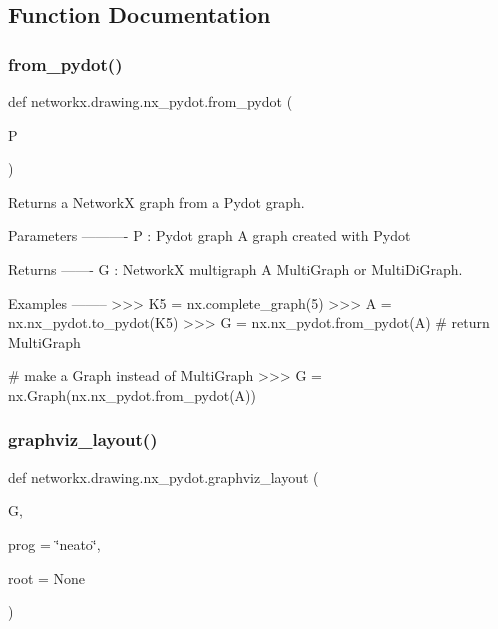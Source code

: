 \subsection{Function Documentation}
\mbox{\label{namespacenetworkx_1_1drawing_1_1nx__pydot_a3384bfb7e6bb5ebb35a2dae9ecf97994}} 
\subsubsection{\texorpdfstring{from\+\_\+pydot()}{from\_pydot()}}
{\footnotesize\ttfamily def networkx.\+drawing.\+nx\+\_\+pydot.\+from\+\_\+pydot (\begin{DoxyParamCaption}\item[{}]{P }\end{DoxyParamCaption})}

\begin{DoxyVerb}Returns a NetworkX graph from a Pydot graph.

Parameters
----------
P : Pydot graph
  A graph created with Pydot

Returns
-------
G : NetworkX multigraph
    A MultiGraph or MultiDiGraph.

Examples
--------
>>> K5 = nx.complete_graph(5)
>>> A = nx.nx_pydot.to_pydot(K5)
>>> G = nx.nx_pydot.from_pydot(A)  # return MultiGraph

# make a Graph instead of MultiGraph
>>> G = nx.Graph(nx.nx_pydot.from_pydot(A))\end{DoxyVerb}
 \mbox{\label{namespacenetworkx_1_1drawing_1_1nx__pydot_ad4e6130de869e7cfbccbc1bbe9bc72e1}} 
\subsubsection{\texorpdfstring{graphviz\+\_\+layout()}{graphviz\_layout()}}
{\footnotesize\ttfamily def networkx.\+drawing.\+nx\+\_\+pydot.\+graphviz\+\_\+layout (\begin{DoxyParamCaption}\item[{}]{G,  }\item[{}]{prog = {\ttfamily \char`\"{}neato\char`\"{}},  }\item[{}]{root = {\ttfamily None} }\end{DoxyParamCaption})}

